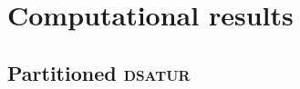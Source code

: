
\section{Computational results}

\subsection{Partitioned \textsc{dsatur}}
\label{subsec:resultspdsatur}